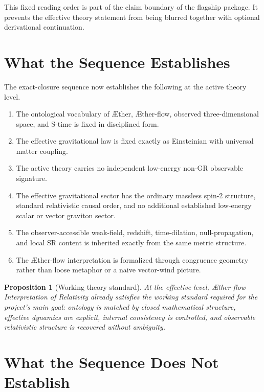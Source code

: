 \documentclass[11pt]{article}
\newcommand{\Aether}{\AE{}ther}
\newcommand{\Aflow}{\AE{}ther-flow}
\newcommand{\TheoryName}{\Aflow{} Interpretation of Relativity}
\newtheorem{proposition}{Proposition}
\begin{document}
This fixed reading order is part of the claim boundary of the flagship package. It prevents the effective theory statement from being blurred together with optional derivational continuation.

\section{What the Sequence Establishes}

The exact-closure sequence now establishes the following at the active theory level.
\begin{enumerate}
    \item The ontological vocabulary of \Aether{}, \Aflow{}, observed three-dimensional space, and S-time is fixed in disciplined form.
    \item The effective gravitational law is fixed exactly as Einsteinian with universal matter coupling.
    \item The active theory carries no independent low-energy non-GR observable signature.
    \item The effective gravitational sector has the ordinary massless spin-2 structure, standard relativistic causal order, and no additional established low-energy scalar or vector graviton sector.
    \item The observer-accessible weak-field, redshift, time-dilation, null-propagation, and local SR content is inherited exactly from the same metric structure.
    \item The \Aflow{} interpretation is formalized through congruence geometry rather than loose metaphor or a naive vector-wind picture.
\end{enumerate}

\begin{proposition}[Working theory standard]
At the effective level, \TheoryName{} already satisfies the working standard required for the project's main goal: ontology is matched by closed mathematical structure, effective dynamics are explicit, internal consistency is controlled, and observable relativistic structure is recovered without ambiguity.
\end{proposition}

\section{What the Sequence Does Not Establish}
\end{document}
